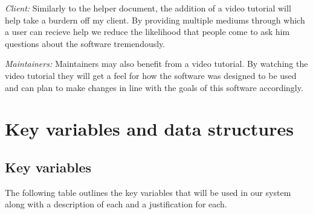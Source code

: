 \textit{Client:}
Similarly to the helper document, the addition of a video tutorial
will help take a burdern off my client. By providing multiple mediums
through which a user can recieve help we reduce the likelihood that
people come to ask him questions about the software tremendously.
\\ \vspace{0.2cm}

\textit{Maintainers:}
Maintainers may also benefit from a video tutorial. By watching the
video tutorial they will get a feel for how the software was designed
to be used and can plan to make changes in line with the goals of this
software accordingly.
\\ \vspace{0.2cm}

\section{Key variables and data structures}

\subsection{Key variables}

The following table outlines the key variables that will
be used in our system along with a description of each and a
justification for each.

